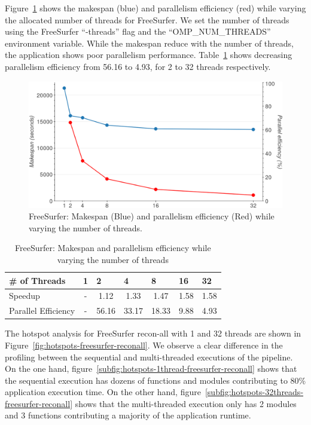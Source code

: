 \documentclass[conference]{IEEEtran}
\begin{document}
Figure~\ref{fig:freesurfer-parallelism} shows the makespan (blue) and parallelism efficiency (red) while varying the allocated number of threads for FreeSurfer. We set the number of threads using the FreeSurfer ``-threads'' flag and the ``OMP\_NUM\_THREADS'' environment variable. While the makespan reduce with the number of threads, the application shows poor parallelism performance. Table~\ref{tab:freesurfer-parallelism} shows decreasing parallelism efficiency from 56.16 to 4.93, for 2 to 32 threads respectively.
\begin{figure}[h!]
	\centering
	\includegraphics[width=\linewidth]{figures/makespan-freesurfer.png}
	\caption{FreeSurfer: Makespan (Blue) and parallelism efficiency (Red) while varying the number of threads.}
	\label{fig:freesurfer-parallelism}
\end{figure}
\begin{table}[h]
	\centering
	\begin{tabular}{@{}lcccccc@{}}
		\toprule
		\# of Threads       & \multicolumn{1}{l}{1} & \multicolumn{1}{l}{2} & \multicolumn{1}{l}{4} & \multicolumn{1}{l}{8} & \multicolumn{1}{l}{16} & \multicolumn{1}{l}{32} \\ \midrule
		Speedup             & -                     & 1.12                  & 1.33                  & 1.47                  & 1.58                   & 1.58                   \\
		Parallel Efficiency & -                     & 56.16                 & 33.17                 & 18.33                 & 9.88                   & 4.93                   \\ \bottomrule
	\end{tabular}
	\caption{FreeSurfer: Makespan and parallelism efficiency while varying the number of threads}
	\label{tab:freesurfer-parallelism}
\end{table}

The hotspot analysis for FreeSurfer recon-all with 1 and 32 threads are shown in Figure~\ref{fig:hotspots-freesurfer-reconall}. We observe a clear difference in the profiling between the sequential and multi-threaded executions of the pipeline. On the one hand, figure~\ref{subfig:hotspots-1thread-freesurfer-reconall} shows that the sequential execution has dozens of functions and modules contributing to 80\% application execution time. On the other hand, figure~\ref{subfig:hotspots-32threads-freesurfer-reconall} shows that the multi-threaded execution only has 2 modules and 3 functions contributing a majority of the application runtime.
\end{document}
